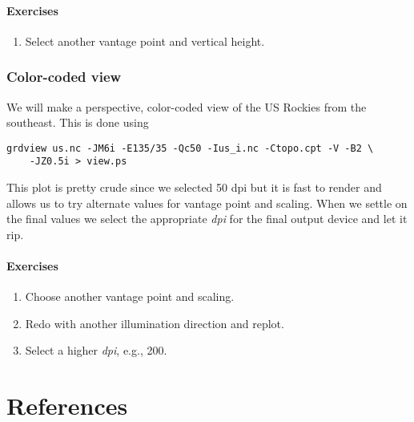 \documentclass[11pt]{report}
\begin{document}
\subsubsection{Exercises}

\begin{enumerate}

\item Select another vantage point and vertical height.

\end{enumerate}

\subsection{Color-coded view}

We will make a perspective, color-coded view of the US Rockies
from the southeast.  This is done using

{\small\begin{verbatim}
grdview us.nc -JM6i -E135/35 -Qc50 -Ius_i.nc -Ctopo.cpt -V -B2 \
    -JZ0.5i > view.ps
\end{verbatim}
}

\noindent
This plot is pretty crude since we selected 50 dpi but it is fast
to render and allows us to try alternate values for vantage point
and scaling.  When we settle on the final values we select the
appropriate \emph{dpi} for the final output device and let it rip.

\subsubsection{Exercises}

\begin{enumerate}

\item Choose another vantage point and scaling.

\item Redo  with another illumination direction and replot.

\item Select a higher \emph{dpi}, e.g., 200.

\end{enumerate}

\chapter{References} 
\end{document}

